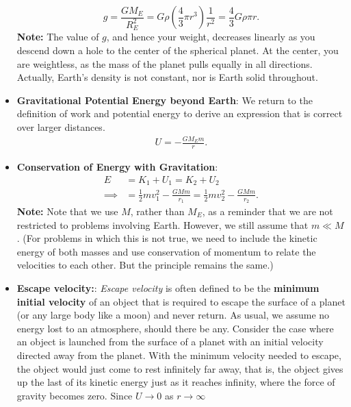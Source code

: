 \documentclass{report}
\begin{document}
\begin{itemize}
            \[ g = \frac{G M_E}{R_E^2} = G \rho \left( \frac{4}{3} \pi r^3 \right) \frac{1}{r^2} = \frac{4}{3} G \rho \pi r. \]
            \bigbreak \noindent 
            \textbf{Note:} The value of $g$, and hence your weight, decreases linearly as you descend down a hole to the center of the spherical planet. At the center, you are weightless, as the mass of the planet pulls equally in all directions.
            \bigbreak \noindent 
            Actually, Earth’s density is not constant, nor is Earth solid throughout.
        \item \textbf{Gravitational Potential Energy beyond Earth}: We return to the definition of work and potential energy to derive an expression that is correct over larger distances.
            \begin{align*}
                U = - \frac{GM_{E}m}{r}
            .\end{align*}
        \item \textbf{Conservation of Energy with Gravitation}:
            \begin{align*}
                E &= K_{1} + U_{1} = K_{2} + U_{2}\\
                \implies &= \frac{1}{2}mv_{1}^{2} - \frac{GMm}{r_{1}} = \frac{1}{2}mv_{2}^{2} - \frac{GMm}{r_{2}}
            .\end{align*}
            \bigbreak \noindent 
            \textbf{Note:}
            Note that we use \(M\), rather than \(M_{E}\), as a reminder that we are not restricted to problems involving Earth. However, we still assume that \(m \ll M\). (For problems in which this is not true, we need to include the kinetic energy of both masses and use conservation of momentum to relate the velocities to each other. But the principle remains the same.)
        \item \textbf{Escape velocity:}:
            \textit{Escape velocity} is often defined to be the \textbf{minimum initial velocity} of an object that is required to escape the surface of a planet (or any large body like a moon) and never return. As usual, we assume no energy lost to an atmosphere, should there be any.
            \bigbreak \noindent 
            Consider the case where an object is launched from the surface of a planet with an initial velocity directed away from the planet. With the minimum velocity needed to escape, the object would just come to rest infinitely far away, that is, the object gives up the last of its kinetic energy just as it reaches infinity, where the force of gravity becomes zero. Since $U \rightarrow 0 $ as $r \rightarrow \infty $

\end{itemize}
\end{document}

